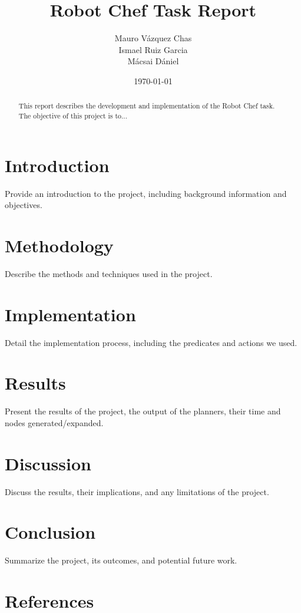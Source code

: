 \documentclass[a4paper,12pt]{article}
\title{Robot Chef Task Report}
\author{Mauro Vázquez Chas \\
Ismael Ruiz Garcia \\
Mácsai Dániel
}
\date{\today}
\begin{document}
\maketitle

\begin{abstract}
This report describes the development and implementation of the Robot Chef task. The objective of this project is to...
\end{abstract}

\tableofcontents

\section{Introduction}
\label{sec:introduction}
Provide an introduction to the project, including background information and objectives.

\section{Methodology}
\label{sec:methodology}
Describe the methods and techniques used in the project.

\section{Implementation}
\label{sec:implementation}
Detail the implementation process, including the predicates and actions we used. 

\section{Results}
\label{sec:results}
Present the results of the project, the output of the planners, their time and nodes generated/expanded. 

\section{Discussion}
\label{sec:discussion}
Discuss the results, their implications, and any limitations of the project.

\section{Conclusion}
\label{sec:conclusion}
Summarize the project, its outcomes, and potential future work.

\section{References}
\label{sec:references}


\end{document}

